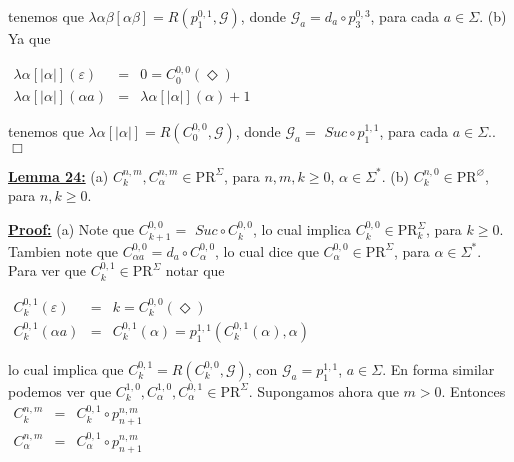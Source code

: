   tenemos que \(\lambda \alpha \beta \left[ \alpha \beta \right] =R\left( p_{1}^{0,1},\mathcal{G}\right) \), donde \(\mathcal{G}_{a}=d_{a}\circ p_{3}^{0,3}\), para cada \(a\in \Sigma \).
  (b) Ya que

  \(\displaystyle \begin{array}{rcl} \lambda \alpha \left[ \left\vert \alpha \right\vert \right] (\varepsilon ) & =& 0=C_{0}^{0,0}(\Diamond ) \\ \lambda \alpha \left[ \left\vert \alpha \right\vert \right] (\alpha a) & =& \lambda \alpha \left[ \left\vert \alpha \right\vert \right] (\alpha )+1 \end{array} \)

  tenemos que \(\lambda \alpha \left[ \left\vert \alpha \right\vert \right] =R\left( C_{0}^{0,0},\mathcal{G}\right) \), donde \(\mathcal{G}_{a}=\) \( Suc\circ p_{1}^{1,1}\), para cada \(a\in \Sigma .\). \(\Box\)


  \textbf{\underline{Lemma 24:}}
  (a) \(C_{k}^{n,m},C_{\alpha }^{n,m}\in \mathrm{PR}^{\Sigma }\), para \( n,m,k\geq 0\), \(\alpha \in \Sigma ^{\ast }\).
  (b) \(C_{k}^{n,0}\in \mathrm{PR}^{\varnothing }\), para \(n,k\geq 0\).


  \textbf{\underline{Proof:}} (a) Note que \(C_{k+1}^{0,0}=\) \(Suc\circ C_{k}^{0,0}\), lo cual implica \( C_{k}^{0,0}\in \mathrm{PR}_{k}^{\Sigma }\), para \(k\geq 0\). Tambien note que \( C_{\alpha a}^{0,0}=d_{a}\circ C_{\alpha }^{0,0}\), lo cual dice que \( C_{\alpha }^{0,0}\in \mathrm{PR}^{\Sigma }\), para \(\alpha \in \Sigma ^{\ast } \). Para ver que \(C_{k}^{0,1}\in \mathrm{PR}^{\Sigma }\) notar que

  \(\displaystyle \begin{array}{rcl} C_{k}^{0,1}(\varepsilon ) & =& k=C_{k}^{0,0}(\Diamond ) \\ C_{k}^{0,1}(\alpha a) & =& C_{k}^{0,1}(\alpha )=p_{1}^{1,1}\left( C_{k}^{0,1}(\alpha ),\alpha \right) \end{array} \)

  lo cual implica que \(C_{k}^{0,1}=R\left( C_{k}^{0,0},\mathcal{G}\right) \), con \(\mathcal{G}_{a}=p_{1}^{1,1}\), \(a\in \Sigma \). En forma similar podemos ver que \(C_{k}^{1,0},C_{\alpha }^{1,0},C_{\alpha }^{0,1}\in \mathrm{PR} ^{\Sigma }\). Supongamos ahora que \(m >0\). Entonces
  \(\displaystyle \begin{array}{rcl} C_{k}^{n,m} & =& C_{k}^{0,1}\circ p_{n+1}^{n,m} \\ C_{\alpha }^{n,m} & =& C_{\alpha }^{0,1}\circ p_{n+1}^{n,m} \end{array} \)


